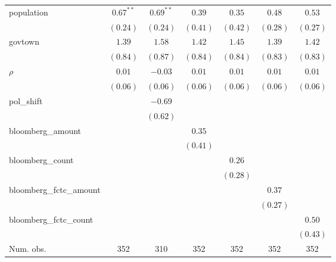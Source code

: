 \begin{table}[!h]
\begin{center}
\begin{tabular}{l c c c c c c }
population              & $0.67^{**}$  & $0.69^{**}$  & $0.39$       & $0.35$       & $0.48$       & $0.53$       \\
                        & $(0.24)$     & $(0.24)$     & $(0.41)$     & $(0.42)$     & $(0.28)$     & $(0.27)$     \\
govtown                 & $1.39$       & $1.58$       & $1.42$       & $1.45$       & $1.39$       & $1.42$       \\
                        & $(0.84)$     & $(0.87)$     & $(0.84)$     & $(0.84)$     & $(0.83)$     & $(0.83)$     \\
$\rho$                  & $0.01$       & $-0.03$      & $0.01$       & $0.01$       & $0.01$       & $0.01$       \\
                        & $(0.06)$     & $(0.06)$     & $(0.06)$     & $(0.06)$     & $(0.06)$     & $(0.06)$     \\
pol\_shift              &              & $-0.69$      &              &              &              &              \\
                        &              & $(0.62)$     &              &              &              &              \\
bloomberg\_amount       &              &              & $0.35$       &              &              &              \\
                        &              &              & $(0.41)$     &              &              &              \\
bloomberg\_count        &              &              &              & $0.26$       &              &              \\
                        &              &              &              & $(0.28)$     &              &              \\
bloomberg\_fctc\_amount &              &              &              &              & $0.37$       &              \\
                        &              &              &              &              & $(0.27)$     &              \\
bloomberg\_fctc\_count  &              &              &              &              &              & $0.50$       \\
                        &              &              &              &              &              & $(0.43)$     \\
\midrule
Num. obs.               & 352          & 310          & 352          & 352          & 352          & 352          \\

\end{tabular}
\end{center}
\end{table}
